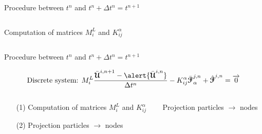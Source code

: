 \begin{frame}{Procedure between $t^n$ and $t^n + \Delta t^n=t^{n+1}$}
\begin{footnotesize}
\begin{columns}
\begin{column}{0.6\textwidth}
\begin{block}{Computation of matrices $M_i^L$ and $K_{ij}^\alpha$}
\begin{columns}
\begin{column}{0.6\textwidth}
            \end{column}
          \end{columns}
        \end{block}
      \end{column}
    \end{columns}
  \end{footnotesize}
\end{frame}

\begin{frame}{Procedure between $t^n$ and $t^n + \Delta t^n=t^{n+1}$}
  \begin{footnotesize}
    \begin{equation*}
      \text{Discrete system: }M^L_{i} \frac{\bar{\Ucb}^{i,n+1} - \alert{\bar{\Ucb}^{i,n}}}{\Delta t^n}  - K_{ij}^\alpha \bar{\Fcb}^{j,n}_{\alpha}  + \hat{\Fcb}^{i,n}=  \vect{0}
    \end{equation*}
    \begin{columns}
      \begin{column}{0.4\textwidth}
        \begin{itemize}
        \item[(1)] Computation of matrices $M_i^L$ and $K_{ij}^\alpha$
        \item[(2)] Projection particles $\rightarrow$ nodes
        \item[]
        \item[]
        \item[]
        \item[]
        \item[]
        \item[]
        \end{itemize}
      \end{column}
      \vrule{}
      \begin{column}{0.6\textwidth}
        \begin{block}{Projection particles $\rightarrow$ nodes}
          \begin{columns}
            \begin{column}{0.3\textwidth}
\end{column}
\end{columns}
\end{block}
\end{column}
\end{columns}
\end{footnotesize}
\end{frame}
